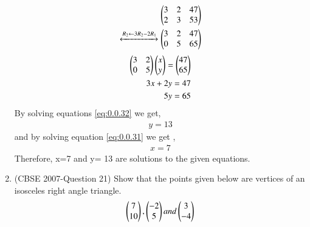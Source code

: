 \documentclass[journal,12pt,twocolumn]{IEEEtran}
\begin{document}
\begin{enumerate}
 \begin{align}
 \begin{pmatrix}3&2&47\\2&3&53\end{pmatrix}
 \\
\xleftrightarrow[]{ R_2 \leftarrow 3R_2 - 2R_1}
 \begin{pmatrix}3&2&47\\0&5&65\end{pmatrix}
 \end{align}
 \begin{align}
\myvec{3&2\\0&5} \myvec{x\\y}= \myvec{47\\65}\\
\medskip
3x+2y= 47 \label{eq:0.0.31}\\
\medskip
5y=65  \label{eq:0.0.32}
\end{align}
By solving equations \eqref{eq:0.0.32} we get,
\begin{align}
y= 13
\end{align}
and by solving equation \eqref{eq:0.0.31} we get ,
\begin{align}
x=7
\end{align}
Therefore, x=7 and y= 13 are solutions to the given equations. 
\bigskip
\item (CBSE 2007-Question 21) Show that the points given below are vertices of an isosceles right angle triangle.
\begin{align}
\begin{pmatrix}7\\10\end{pmatrix}, \begin{pmatrix}-2\\5\end{pmatrix} and \begin{pmatrix}3\\-4\end{pmatrix}
\end{align}


\end{enumerate}
\end{document}
